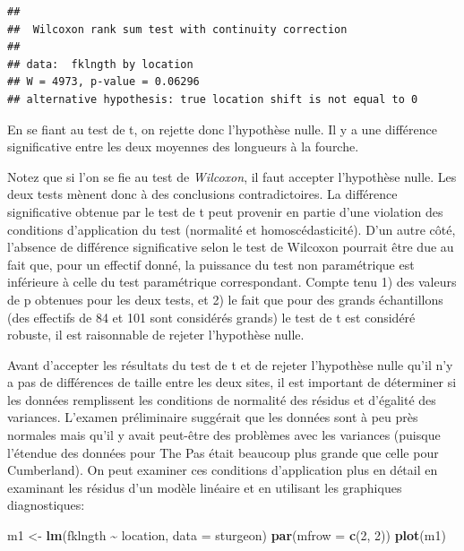 \documentclass[
  12pt,
]{book}
\newenvironment{Shaded}{\begin{snugshade}}{\end{snugshade}}
\newcommand{\DataTypeTok}[1]{\textcolor[rgb]{0.13,0.29,0.53}{#1}}
\newcommand{\DecValTok}[1]{\textcolor[rgb]{0.00,0.00,0.81}{#1}}
\newcommand{\KeywordTok}[1]{\textcolor[rgb]{0.13,0.29,0.53}{\textbf{#1}}}
\newcommand{\NormalTok}[1]{#1}
\newcommand{\OperatorTok}[1]{\textcolor[rgb]{0.81,0.36,0.00}{\textbf{#1}}}
\newcommand{\StringTok}[1]{\textcolor[rgb]{0.31,0.60,0.02}{#1}}
\begin{document}
\begin{verbatim}
## 
##  Wilcoxon rank sum test with continuity correction
## 
## data:  fklngth by location
## W = 4973, p-value = 0.06296
## alternative hypothesis: true location shift is not equal to 0
\end{verbatim}

En se fiant au test de t, on rejette donc l'hypothèse nulle. Il y a une différence significative entre les deux moyennes des longueurs à la fourche.

Notez que si l'on se fie au test de \emph{Wilcoxon}, il faut accepter l'hypothèse nulle. Les deux tests mènent donc à des conclusions contradictoires. La différence significative obtenue par le test de t peut provenir en partie d'une violation des conditions d'application du test (normalité et homoscédasticité). D'un autre côté, l'absence de différence significative selon le test de Wilcoxon pourrait être due au fait que, pour un effectif donné, la puissance du test non paramétrique est inférieure à celle du test paramétrique correspondant. Compte tenu 1) des valeurs de p obtenues pour les deux tests, et 2) le fait que pour des grands échantillons (des effectifs de 84 et 101 sont considérés grands) le test de t est considéré robuste, il est raisonnable de rejeter l'hypothèse nulle.

Avant d'accepter les résultats du test de t et de rejeter l'hypothèse nulle qu'il n'y a pas de différences de taille entre les deux sites, il est important de déterminer si les données remplissent les conditions de normalité des résidus et d'égalité des variances. L'examen préliminaire suggérait que les données sont à peu près normales mais qu'il y avait peut-être des problèmes avec les variances (puisque l'étendue des données pour The Pas était beaucoup plus grande que celle pour Cumberland). On peut examiner ces conditions d'application plus en détail en examinant les résidus d'un modèle linéaire et en utilisant les graphiques diagnostiques:

\begin{Shaded}
\begin{Highlighting}[]
\NormalTok{m1 \textless{}{-}}\StringTok{ }\KeywordTok{lm}\NormalTok{(fklngth }\OperatorTok{\textasciitilde{}}\StringTok{ }\NormalTok{location, }\DataTypeTok{data =}\NormalTok{ sturgeon)}
\KeywordTok{par}\NormalTok{(}\DataTypeTok{mfrow =} \KeywordTok{c}\NormalTok{(}\DecValTok{2}\NormalTok{, }\DecValTok{2}\NormalTok{))}
\KeywordTok{plot}\NormalTok{(m1)}
\end{Highlighting}
\end{Shaded}
\end{document}
